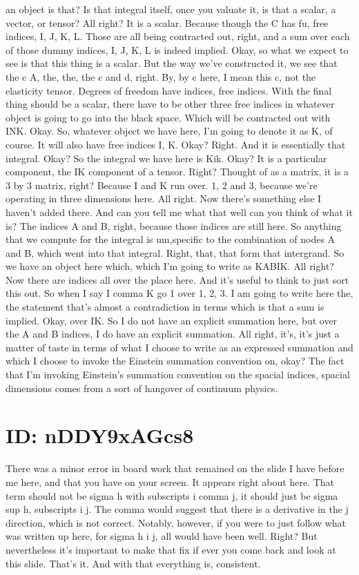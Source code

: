 \documentclass[10pt]{article}
\begin{document}
an object is that? Is that integral itself, once you valuate it, is that a scalar, a vector, or tensor? All right? It is a scalar. Because though the C has fu, free indices, I, J, K, L. Those are all being contracted out, right, and a sum over each of those dummy indices, I, J, K, L is indeed implied. Okay, so what we expect to see is that this thing is a scalar. But the way we've constructed it, we see that the c A, the, the, the c and d, right. By, by c here, I mean this c, not the elasticity tensor. Degrees of freedom have indices, free indices. With the final thing should be a scalar, there have to be other three free indices in whatever object is going to go into the black space. Which will be contracted out with INK. Okay. So, whatever object we have here, I'm going to denote it as K, of course. It will also have free indices I, K. Okay? Right. And it is essentially that integral. Okay? So the integral we have here is Kik. Okay? It is a particular component, the IK component of a tensor. Right? Thought of as a matrix, it is a 3 by 3 matrix, right? Because I and K run over. 1, 2 and 3, because we're operating in three dimensions here. All right. Now there's something else I haven't added there. And can you tell me what that well can you think of what it is? The indices A and B, right, because those indices are still here. So anything that we compute for the integral is um,specific to the combination of nodes A and B, which went into that integral. Right, that, that form that intergrand. So we have an object here which, which I'm going to write as KABIK. All right? Now there are indices all over the place here. And it's useful to think to just sort this out. So when I say I comma K go 1 over 1, 2, 3. I am going to write here the, the statement that's almost a contradiction in terms which is that a sum is implied.  Okay, over IK. So I do not have an explicit summation here, but over the A and B indices, I do have an explicit summation. All right, it's, it's just a matter of taste in terms of what I choose to write as an expressed summation and which I choose to invoke the Einstein summation convention on, okay? The fact that I'm invoking Einstein's summation convention on the spacial indices, spacial dimensions comes from a sort of hangover of continuum physics.

\section*{ID: nDDY9xAGcs8}
There was a minor error in board work that remained on the slide I have before me here, and that you have on your screen. It appears right about here. That term should not be sigma h with subscripts i comma j, it should just be sigma sup h, subscripts i j. The comma would suggest that there is a derivative in the j direction, which is not correct. Notably, however, if you were to just follow what was written up here, for sigma h i j, all would have been well. Right? But nevertheless it's important to make that fix if ever you come back and look at this slide. That's it. And with that everything is, consistent.
\end{document}
